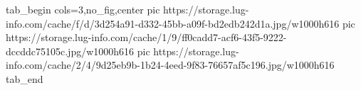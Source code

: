  
 
 
 
 


\ifcmt
  tab_begin cols=3,no_fig,center
     pic https://storage.lug-info.com/cache/f/d/3d254a91-d332-45bb-a09f-bd2edb242d1a.jpg/w1000h616%
		 pic https://storage.lug-info.com/cache/1/9/ff0cadd7-acf6-43f5-9222-dccddc75105c.jpg/w1000h616%
		 pic https://storage.lug-info.com/cache/2/4/9d25eb9b-1b24-4eed-9f83-76657af5c196.jpg/w1000h616%
  tab_end
\fi
